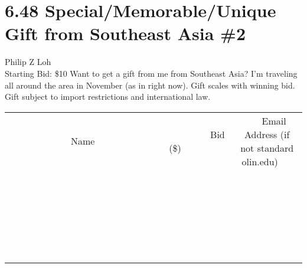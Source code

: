 \documentclass[11pt]{article}
\begin{document}
\section*{6.48 Special/Memorable/Unique Gift from Southeast Asia \#2}
Philip Z Loh
\\
Starting Bid: \$10
\newline
Want to get a gift from me from Southeast Asia? I'm traveling all around the area in November (as in right now). Gift scales with winning bid. Gift subject to import restrictions and international law.
\\[6ex]
\begin{tabular}{c c c}
~~~~~~~~~~~~~Name~~~~~~~~~~~~~ & ~~~~~~~~~Bid (\$)~~~~~~~~~  & ~~~Email Address (if not standard olin.edu)~~~\\
 & & \\
\hline
 & & \\
\hline
 & & \\
\hline
 & & \\
\hline
 & & \\
\hline
 & & \\
\hline
 & & \\
\hline
 & & \\
\hline
 & & \\
\hline
 & & \\
\hline
 & & \\
\hline
 & & \\
\hline
 & & \\
\hline
 & & \\
\hline
 & & \\
\hline
 & & \\
\hline
 & & \\
\hline
 & & \\
\hline
 & & \\
\hline
 & & \\
\hline
 & & \\
\hline
 & & \\
\hline
 & & \\
\hline
 & & \\
\hline
 & & \\
\hline
 & & \\
\hline
\end{tabular}
\newpage
\end{document}
